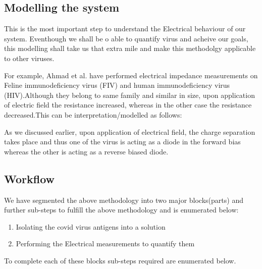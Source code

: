 \documentclass{FR16}
\begin{document}
\subsection{Modelling the system}
This is the most important step to understand the Electrical behaviour of our system. Eventhough we shall be o able to quantify virus and acheive our goals, this modelling shall take us that extra mile and make this methodolgy applicable to other viruses. 

For example, Ahmad et al. have performed electrical impedance measurements on Feline immunodeficiency virus (FIV) and
human immunodeficiency virus (HIV).Although they belong to same family and similar in size, upon application of electric field the resistance increased, whereas in the other case the resistance decreased.This can  be interpretation/modelled as follows:

As we discussed earlier, upon application of electrical field, the 
charge separation takes place and thus one of the virus is acting as a diode in the forward bias whereas the other is acting as a reverse biased diode.






\subsection{Workflow}
We have segmented the above methodology into two major blocks(parts) and further sub-steps  to fulfill the above methodology and is enumerated below:
\begin{enumerate}
    \item Isolating the covid virus antigens into a solution
    
    \item Performing the Electrical measurements to quantify them
\end{enumerate}

To complete each of  these blocks  sub-steps required are enumerated below.
\end{document}
